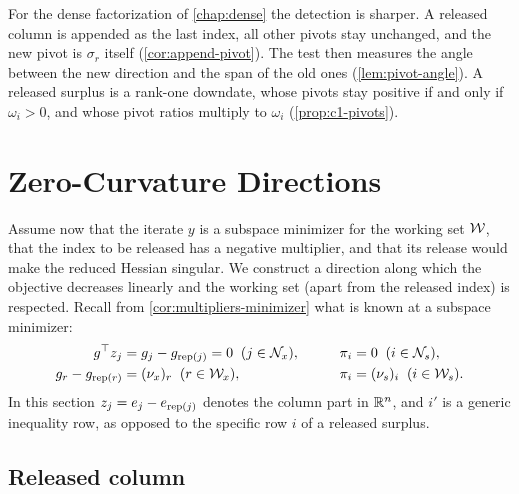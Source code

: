 \medskip

For the dense factorization of \cref{chap:dense} the detection is sharper. A released column is
appended as the last index, all other pivots stay unchanged, and the new pivot is $\sigma_r$
itself (\cref{cor:append-pivot}). The test then measures the angle between the new direction
and the span of the old ones (\cref{lem:pivot-angle}). A released surplus is a rank-one downdate, whose pivots stay
positive if and only if $\omega_i>0$, and whose pivot ratios multiply to $\omega_i$
(\cref{prop:c1-pivots}).


\section{Zero-Curvature Directions}
\label{sec:zero-curvature}

Assume now that the iterate $y$ is a subspace minimizer for the working set $\mathcal{W}$, that the
index to be released has a negative multiplier, and that its release would make the reduced
Hessian singular. We construct a direction along which the objective decreases linearly and
the working set (apart from the released index) is respected. Recall from
\cref{cor:multipliers-minimizer} what is known at a subspace minimizer:
\begin{equation} \label{eq:minimizer-facts}
\begin{aligned}
g^\top z_j &= g_j - g_{\operatorname{rep}(j)} = 0 \;\;(j\in\mathcal{N}_x), &\qquad \pi_i &= 0 \;\;(i\in\mathcal{N}_s),\\
g_r - g_{\operatorname{rep}(r)} &= (\nu_x)_r \;\;(r\in\mathcal{W}_x), & \pi_i &= (\nu_s)_i \;\;(i\in\mathcal{W}_s).
\end{aligned}
\end{equation}
In this section $z_j = e_j - e_{\operatorname{rep}(j)}$ denotes the column part in $\mathbb{R}^n$, and $i'$ is a
generic inequality row, as opposed to the specific row $i$ of a released surplus.

\subsection{Released column}

